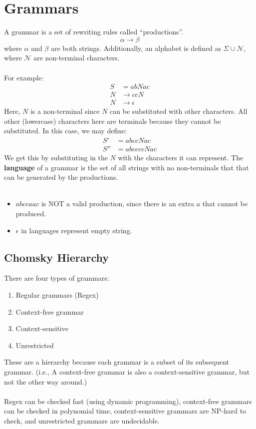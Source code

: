 \documentclass[10pt]{article}
\begin{document}
\section*{Grammars}
A grammar is a set of rewriting rules called ``productions''.
\[\alpha \rightarrow \beta\]
where $\alpha$ and $\beta$ are both strings.  Additionally, an alphabet is defined as $\Sigma \cup \mathcal{N}$, where $\mathcal{N}$ are non-terminal characters.\\\\
For example:
\begin{align*}
    S &= abNac \\
    N &\rightarrow ccN \\
    N &\rightarrow \epsilon
\end{align*}
Here, $N$ is a non-terminal since $N$ can be substituted with other characters.  All other (lowercase) characters here are terminals because they cannot be substituted.
In this case, we may define:
\begin{align*}
    S' &= abccNac \\
    S'' &= abccccNac
\end{align*}
We get this by substituting in the $N$ with the characters it can represent.  The \textbf{language} of a grammar is the set of all strings with no non-terminals that that can be generated by the productions.\\\\
\begin{itemize}
    \item $abccaac$ is NOT a valid production, since there is an extra $a$ that cannot be produced.
    \item $\epsilon$ in languages represent empty string.
\end{itemize}

\subsection*{Chomsky Hierarchy}
There are four types of grammars:
\begin{enumerate}
    \item Regular grammars (Regex)
    \item Context-free grammar
    \item Context-sensitive
    \item Unrestricted
\end{enumerate}
These are a hierarchy because each grammar is a subset of its subsequent grammar.  (i.e., A context-free grammar is also a context-sensitive grammar, but not the other way around.)\\\\
Regex can be checked fast (using dynamic programming), context-free grammars can be checked in polynomial time, context-sensitive grammars are NP-hard to check, and unrestricted grammars are undecidable.
\end{document}

